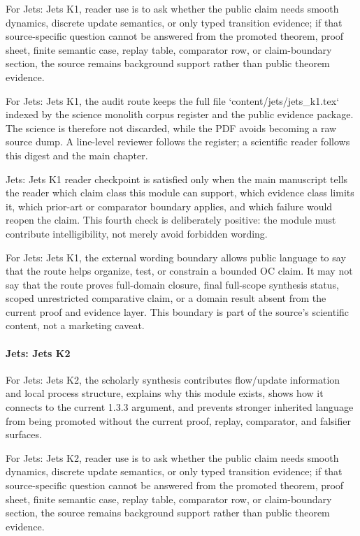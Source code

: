 For Jets: Jets K1, reader use is to ask whether the public claim needs smooth dynamics, discrete update semantics, or only typed transition evidence; if that source-specific question cannot be answered from the promoted theorem, proof sheet, finite semantic case, replay table, comparator row, or claim-boundary section, the source remains background support rather than public theorem evidence.


For Jets: Jets K1, the audit route keeps the full file `content/jets/jets\_k1.tex` indexed by the science monolith corpus register and the public evidence package. The science is therefore not discarded, while the PDF avoids becoming a raw source dump. A line-level reviewer follows the register; a scientific reader follows this digest and the main chapter.


Jets: Jets K1 reader checkpoint is satisfied only when the main manuscript tells the reader which claim class this module can support, which evidence class limits it, which prior-art or comparator boundary applies, and which failure would reopen the claim. This fourth check is deliberately positive: the module must contribute intelligibility, not merely avoid forbidden wording.


For Jets: Jets K1, the external wording boundary allows public language to say that the route helps organize, test, or constrain a bounded OC claim. It may not say that the route proves full-domain closure, final full-scope synthesis status, scoped unrestricted comparative claim, or a domain result absent from the current proof and evidence layer. This boundary is part of the source's scientific content, not a marketing caveat.


\paragraph{Jets: Jets K2}

For Jets: Jets K2, the scholarly synthesis contributes flow/update information and local process structure, explains why this module exists, shows how it connects to the current 1.3.3 argument, and prevents stronger inherited language from being promoted without the current proof, replay, comparator, and falsifier surfaces.


For Jets: Jets K2, reader use is to ask whether the public claim needs smooth dynamics, discrete update semantics, or only typed transition evidence; if that source-specific question cannot be answered from the promoted theorem, proof sheet, finite semantic case, replay table, comparator row, or claim-boundary section, the source remains background support rather than public theorem evidence.



